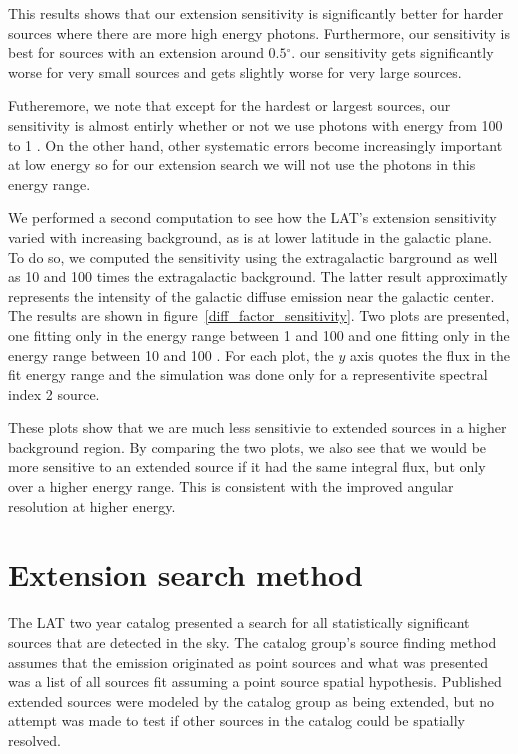 \documentclass[12pt,preprint]{aastex}
\newcommand{\mev}{\text{MeV}\xspace}
\newcommand{\gev}{\text{GeV}\xspace}
\renewcommand{\deg}{\ensuremath{^\circ}\xspace}
\begin{document}
This results shows that our extension sensitivity is
significantly better for harder sources where there are more high
energy photons. Furthermore, our sensitivity is best for sources with an
extension around $0.5\deg$.  our sensitivity gets significantly worse
for very small sources and gets slightly worse for very large sources.

Futheremore, we note that except for the hardest or largest sources,
our sensitivity is almost entirly whether or not we use photons 
with energy from
100 \mev to 1 \gev. On the other hand, other systematic errors become
increasingly important at low energy so for our extension search we will
not use the photons in this energy range.

We performed a second computation to see how the LAT's extension
sensitivity varied with increasing background, as is at lower latitude
in the galactic plane. To do so, we computed the sensitivity using the
extragalactic barground as well as 10 and 100 times the extragalactic
background. The latter result approximatly represents the intensity of
the galactic diffuse emission near the galactic center. The results are
shown in figure~\ref{diff_factor_sensitivity}. Two plots are presented,
one fitting only in the energy range between 1 \gev and 100 \gev and
one fitting only in the energy range between 10 \gev and 100 \gev. For
each plot, the $y$ axis quotes the flux in the fit energy range and the
simulation was done only for a representivite spectral index 2 source.

These plots show that we are much less sensitivie to extended sources in
a higher background region. By comparing the two plots, we also see that
we would be more sensitive to an extended source if it had the same
integral flux, but only over a higher energy range. This is 
consistent with the improved angular resolution at higher energy.

\section{Extension search method}

The LAT two year catalog presented a search for all
statistically significant sources that are detected in the \gev
sky\cite{second_cat}.  The catalog group's source finding method assumes
that the emission originated as point sources and what was presented was
a list of all sources fit assuming a point source spatial hypothesis. 
Published extended sources were modeled by the catalog group as 
being extended, but no attempt was made to test if other sources in the catalog
could be spatially resolved.
\end{document}
